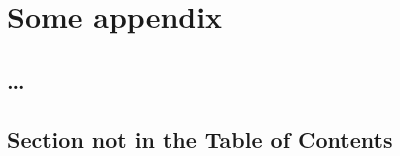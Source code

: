 \chapter{Some appendix}
\label{app.1}
\section{\dots}
\section*{Section not in the Table of Contents}